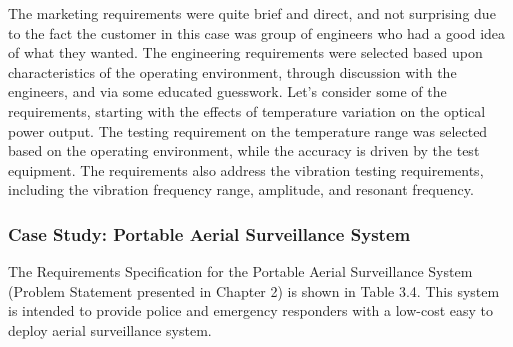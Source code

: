 The marketing requirements were quite brief and direct, and not
surprising due to the fact the customer in this case was group of
engineers who had a good idea of what they wanted. The engineering
requirements were selected based upon characteristics of the operating
environment, through discussion with the engineers, and via some
educated guesswork. Let's consider some of the requirements, starting
with the effects of temperature variation on the optical power output.
The testing requirement on the temperature range was selected based on
the operating environment, while the accuracy is driven by the test
equipment. The requirements also address the vibration testing
requirements, including the vibration frequency range, amplitude, and
resonant frequency.

\subsubsection{Case Study: Portable Aerial Surveillance
System}\label{case-study-portable-aerial-surveillance-system}

The Requirements Specification for the Portable Aerial Surveillance
System (Problem Statement presented in Chapter 2) is shown in Table 3.4.
This system is intended to provide police and emergency responders with
a low-cost easy to deploy aerial surveillance system.

